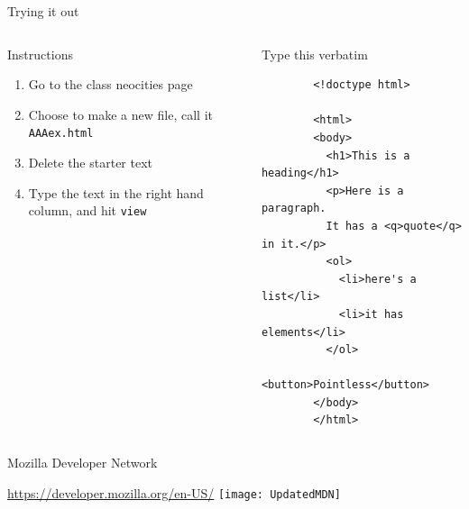 \documentclass[notes]{beamer}
\begin{document}
\begin{frame}[fragile]{Trying it out}
  \begin{columns}
    \begin{column}{0.35\columnwidth}
      \begin{block}{Instructions}
        \begin{enumerate}
          \item Go to the class neocities page
          \item Choose to make a new file, call it \texttt{AAAex.html}
          \item Delete the starter text
          \item Type the text in the right hand column, and hit \texttt{view}
        \end{enumerate}
      \end{block}
    \end{column}
    \begin{column}{0.65\columnwidth}
      \begin{block}{Type this verbatim}
        \begin{verbatim}
        <!doctype html>

        <html>
        <body>
          <h1>This is a heading</h1>
          <p>Here is a paragraph. 
          It has a <q>quote</q> in it.</p>
          <ol>
            <li>here's a list</li>
            <li>it has elements</li>
          </ol>
          <button>Pointless</button>  
        </body>
        </html>
      \end{verbatim}
      \end{block}
    \end{column}
  \end{columns}
\end{frame}

\begin{frame}{Mozilla Developer Network}
  \begin{block}{\url{https://developer.mozilla.org/en-US/}}
    \texttt{[image: UpdatedMDN]}
  \end{block}
\end{frame}
\end{document}

